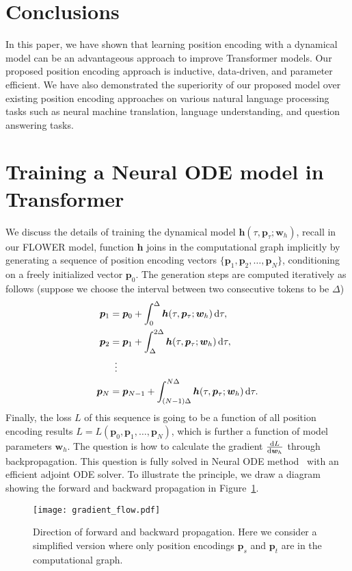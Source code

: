 \documentclass[11pt]{article}
\def\vh{{\bm{h}}}
\def\vp{{\bm{p}}}
\def\vw{{\bm{w}}}
\begin{document}
\section{Conclusions}
In this paper, we have shown that learning position encoding with a dynamical model can be an advantageous approach to improve Transformer models. Our proposed position encoding approach is inductive, data-driven, and parameter efficient. We have also demonstrated the superiority of our proposed model over existing position encoding approaches on various natural language processing tasks such as neural machine translation, language understanding, and question answering tasks.




\appendix
\section{Training a Neural ODE model in Transformer}
We discuss the details of training the dynamical model $\vh(\tau, \vp_{\tau};\vw_h)$, recall in our FLOWER model, function $\vh$ joins in the computational graph implicitly by generating a sequence of position encoding vectors $\{\vp_1, \vp_2, \dots, \vp_N\}$, conditioning on a freely initialized vector $\vp_0$. The generation steps are computed iteratively as follows (suppose we choose the interval between two consecutive tokens to be $\Delta$) 
\begin{equation}
    \label{eq:p-iterate}
    \begin{aligned}
    \vp_1&=\vp_0+\int_0^{\Delta}\vh(\tau,\vp_{\tau};\vw_h)\dif \tau,\\
    \vp_2&=\vp_1+\int_{\Delta}^{2\Delta}\vh(\tau,\vp_{\tau};\vw_h)\dif \tau,\\
      & \vdotswithin{=} \\
    \vp_N&=\vp_{N-1}+\int_{(N-1)\Delta}^{N\Delta}\vh(\tau,\vp_{\tau};\vw_h)\dif \tau.\\
    \end{aligned}
\end{equation}
Finally, the loss $L$ of this sequence is going to be a function of all position encoding results $L=L(\vp_0,\vp_1,\dots,\vp_N)$, which is further a function of model parameters $\vw_h$. The question is how to calculate the gradient $\frac{\dif L}{\dif \vw_h}$ through backpropagation. This question is fully solved in Neural ODE method~\cite{chen2018neural} with an efficient adjoint ODE solver. To illustrate the principle, we draw a diagram showing the forward and backward propagation in Figure~\ref{fig:gradient-flow}.
\begin{figure}[htb]
    \centering
    \texttt{[image: gradient\_flow.pdf]}
    \caption{Direction of forward and backward propagation. Here we consider a simplified version where only position encodings $\vp_s$ and $\vp_t$ are in the computational graph.}
    \label{fig:gradient-flow}
\end{figure}
\end{document}
